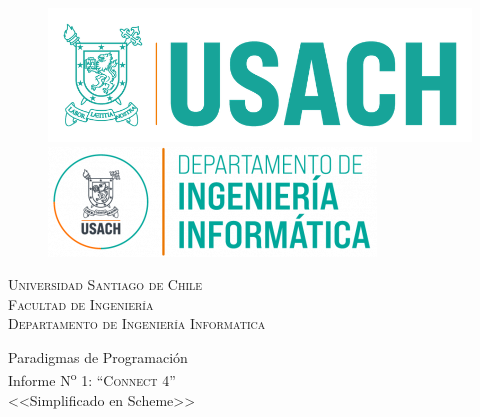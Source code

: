 \documentclass[12pt]{article}
\begin{document}
	\begin{titlepage}
		\begin{center}
			\begin{center}
				\noindent%
				\begin{figure}[t]
					\includegraphics[width=0.237\linewidth]{usach}\hfill
					\includegraphics[width=0.237\linewidth]{diinf}\\
				\end{figure}
				
				\begin{minipage}[b]{0.5\textwidth}
					\centering
					\large{
						{\textsc{Universidad Santiago de Chile\\
								Facultad de Ingeniería\\
								Departamento de Ingeniería Informatica\\
					}}}
				\end{minipage}%
				
				
				
				\label{fig:diinf}
				
				
			\end{center}
			
			\vspace{\fill}
			
			\huge{{Paradigmas de Programación} \\
				{Informe N\textsuperscript{o} 1: ``\textsc{Connect 4}'' }\\
				<<Simplificado en Scheme>>
			}
			\vspace{\fill} 
		\end{center}
		

\end{titlepage}
\end{document}
